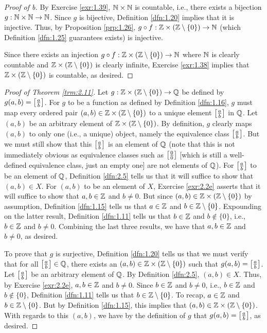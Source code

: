 \documentclass[../main.tex]{subfiles}
\begin{document}
\begin{theorem}
\begin{lemma*}
\begin{proof}[Proof of b]
            By Exercise \ref{exr:1.39}, $\mathbb{N}\times\mathbb{N}$ is countable, i.e., there exists a bijection $g:\mathbb{N}\times\mathbb{N}\to\mathbb{N}$. Since $g$ is bijective, Definition \ref{dfn:1.20} implies that it is injective. Thus, by Proposition \ref{prp:1.26}, $g\circ f:\mathbb{Z}\times(\mathbb{Z}\setminus\{0\})\to\mathbb{N}$ (which Definition \ref{dfn:1.25} guarantees exists) is injective.\par
            Since there exists an injection $g\circ f:\mathbb{Z}\times(\mathbb{Z}\setminus\{0\})\to\mathbb{N}$ where $\mathbb{N}$ is clearly countable and $\mathbb{Z}\times(\mathbb{Z}\setminus\{0\})$ is clearly infinite, Exercise \ref{exr:1.38} implies that $\mathbb{Z}\times(\mathbb{Z}\setminus\{0\})$ is countable, as desired.
        \end{proof}
    \end{lemma*}
    \begin{proof}[Proof of Theorem \ref{trm:2.11}]
        Let $g:\mathbb{Z}\times(\mathbb{Z}\setminus\{0\})\to\mathbb{Q}$ be defined by $g(a,b)=\left[ \frac{a}{b} \right]$. For $g$ to be a function as defined by Definition \ref{dfn:1.16}, $g$ must map every ordered pair $(a,b)\in\mathbb{Z}\times(\mathbb{Z}\setminus\{0\})$ to a unique element $\left[ \frac{a}{b} \right]$ in $\mathbb{Q}$. Let $(a,b)$ be an arbitrary element of $\mathbb{Z}\times(\mathbb{Z}\setminus\{0\})$. By definition, $g$ clearly maps $(a,b)$ to only one (i.e., a unique) object, namely the equivalence class $\left[ \frac{a}{b} \right]$. But we must still show that this $\left[ \frac{a}{b} \right]$ is an element of $\mathbb{Q}$ (note that this is not immediately obvious as equivalence classes such as $\left[ \frac{0}{0} \right]$ [which is still a well-defined equivalence class, just an empty one] are not elements of $\mathbb{Q}$). For $\left[ \frac{a}{b} \right]$ to be an element of $\mathbb{Q}$, Definition \ref{dfn:2.5} tells us that it will suffice to show that $(a,b)\in X$. For $(a,b)$ to be an element of $X$, Exercise \ref{exr:2.2e} asserts that it will suffice to show that $a,b\in\mathbb{Z}$ and $b\neq 0$. But since $(a,b)\in\mathbb{Z}\times(\mathbb{Z}\setminus\{0\})$ by assumption, Definition \ref{dfn:1.15} tells us that $a\in\mathbb{Z}$ and $b\in\mathbb{Z}\setminus\{0\}$. Expounding on the latter result, Definition \ref{dfn:1.11} tells us that $b\in\mathbb{Z}$ and $b\notin\{0\}$, i.e., $b\in\mathbb{Z}$ and $b\neq 0$. Combining the last three results, we have that $a,b\in\mathbb{Z}$ and $b\neq 0$, as desired.\par
        To prove that $g$ is surjective, Definition \ref{dfn:1.20} tells us that we must verify that for all $\left[ \frac{a}{b} \right]\in\mathbb{Q}$, there exists an $(a,b)\in\mathbb{Z}\times(\mathbb{Z}\setminus\{0\})$ such that $g(a,b)=\left[ \frac{a}{b} \right]$. Let $\left[ \frac{a}{b} \right]$ be an arbitrary element of $\mathbb{Q}$. By Definition \ref{dfn:2.5}, $(a,b)\in X$. Thus, by Exercise \ref{exr:2.2e}, $a,b\in\mathbb{Z}$ and $b\neq 0$. Since $b\in\mathbb{Z}$ and $b\neq 0$, i.e., $b\in\mathbb{Z}$ and $b\notin\{0\}$, Definition \ref{dfn:1.11} tells us that $b\in\mathbb{Z}\setminus\{0\}$. To recap, $a\in\mathbb{Z}$ and $b\in\mathbb{Z}\setminus\{0\}$. But by Definition \ref{dfn:1.15}, this implies that $(a,b)\in\mathbb{Z}\times(\mathbb{Z}\setminus\{0\})$. With regards to this $(a,b)$, we have by the definition of $g$ that $g(a,b)=\left[ \frac{a}{b} \right]$, as desired.\par

\end{proof}
\end{theorem}
\end{document}
